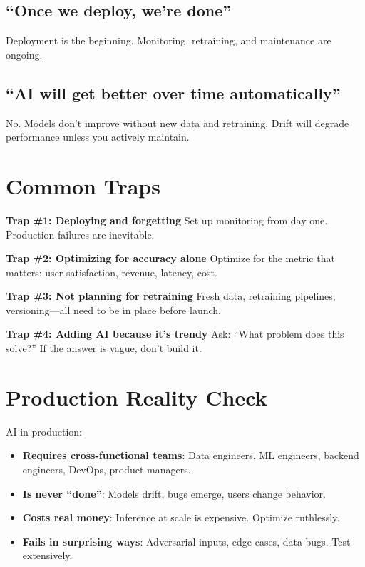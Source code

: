 \subsection{``Once we deploy, we're done''}
Deployment is the beginning. Monitoring, retraining, and maintenance are ongoing.

\subsection{``AI will get better over time automatically''}
No. Models don't improve without new data and retraining. Drift will degrade performance unless you actively maintain.

\section{Common Traps}

\textbf{Trap \#1: Deploying and forgetting}
Set up monitoring from day one. Production failures are inevitable.

\textbf{Trap \#2: Optimizing for accuracy alone}
Optimize for the metric that matters: user satisfaction, revenue, latency, cost.

\textbf{Trap \#3: Not planning for retraining}
Fresh data, retraining pipelines, versioning---all need to be in place before launch.

\textbf{Trap \#4: Adding AI because it's trendy}
Ask: ``What problem does this solve?'' If the answer is vague, don't build it.

\section{Production Reality Check}

AI in production:

\begin{itemize}
\item \textbf{Requires cross-functional teams}: Data engineers, ML engineers, backend engineers, DevOps, product managers.
\item \textbf{Is never ``done''}: Models drift, bugs emerge, users change behavior.
\item \textbf{Costs real money}: Inference at scale is expensive. Optimize ruthlessly.
\item \textbf{Fails in surprising ways}: Adversarial inputs, edge cases, data bugs. Test extensively.
\end{itemize}

